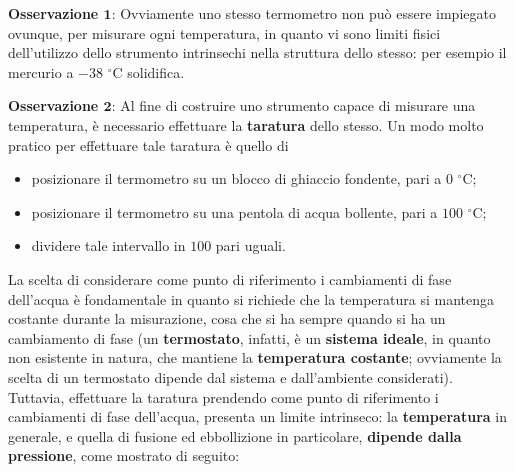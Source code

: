 \documentclass[a4paper]{extarticle}
\begin{document}
\vspace{2em}
\noindent
\textbf{Osservazione $\boldsymbol{1}$}: Ovviamente uno stesso termometro non può essere impiegato ovunque, per misurare ogni temperatura, in quanto vi sono limiti fisici dell'utilizzo dello strumento intrinsechi nella struttura dello stesso: per esempio il mercurio a $-38$ $^\circ$C solidifica.

\newpage
\noindent
\textbf{Osservazione $\boldsymbol{2}$}: Al fine di costruire uno strumento capace di misurare una temperatura, è necessario effettuare la \textbf{taratura} dello stesso. Un modo molto pratico per effettuare tale taratura è quello di
\begin{itemize}
  \item posizionare il termometro su un blocco di ghiaccio fondente, pari a $0$ $^\circ$C;
  \item posizionare il termometro su una pentola di acqua bollente, pari a $100$ $^\circ$C;
  \item dividere tale intervallo in $100$ pari uguali.
\end{itemize}
La scelta di considerare come punto di riferimento i cambiamenti di fase dell'acqua è fondamentale in quanto si richiede che la temperatura si mantenga costante durante la misurazione, cosa che si ha sempre quando si ha un cambiamento di fase (un \textbf{termostato}, infatti, è un \textbf{sistema ideale}, in quanto non esistente in natura, che mantiene la \textbf{temperatura costante}; ovviamente la scelta di un termostato dipende dal sistema e dall'ambiente considerati).\\
Tuttavia, effettuare la taratura prendendo come punto di riferimento i cambiamenti di fase dell'acqua, presenta un limite intrinseco: la \textbf{temperatura} in generale, e quella di fusione ed ebbollizione in particolare, \textbf{dipende dalla pressione}, come mostrato di seguito:
\end{document}
